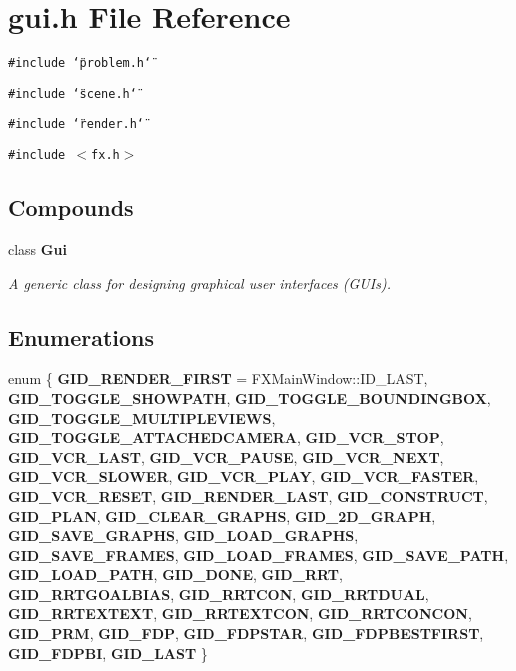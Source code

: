 \section{gui.h File Reference}
\label{gui_h}
{\tt \#include \char`\"{}problem.h\char`\"{}}\par
{\tt \#include \char`\"{}scene.h\char`\"{}}\par
{\tt \#include \char`\"{}render.h\char`\"{}}\par
{\tt \#include $<$fx.h$>$}\par
\subsection*{Compounds}
\begin{CompactItemize}
\item 
class {\bf Gui}
\begin{CompactList}\small\item\em A generic class for designing graphical user interfaces (GUIs).\item\end{CompactList}\end{CompactItemize}
\subsection*{Enumerations}
\begin{CompactItemize}
\item 
enum \{ {\bf GID\_\-RENDER\_\-FIRST} =  FXMain\-Window::ID\_\-LAST, 
{\bf GID\_\-TOGGLE\_\-SHOWPATH}, 
{\bf GID\_\-TOGGLE\_\-BOUNDINGBOX}, 
{\bf GID\_\-TOGGLE\_\-MULTIPLEVIEWS}, 
{\bf GID\_\-TOGGLE\_\-ATTACHEDCAMERA}, 
{\bf GID\_\-VCR\_\-STOP}, 
{\bf GID\_\-VCR\_\-LAST}, 
{\bf GID\_\-VCR\_\-PAUSE}, 
{\bf GID\_\-VCR\_\-NEXT}, 
{\bf GID\_\-VCR\_\-SLOWER}, 
{\bf GID\_\-VCR\_\-PLAY}, 
{\bf GID\_\-VCR\_\-FASTER}, 
{\bf GID\_\-VCR\_\-RESET}, 
{\bf GID\_\-RENDER\_\-LAST}, 
{\bf GID\_\-CONSTRUCT}, 
{\bf GID\_\-PLAN}, 
{\bf GID\_\-CLEAR\_\-GRAPHS}, 
{\bf GID\_\-2D\_\-GRAPH}, 
{\bf GID\_\-SAVE\_\-GRAPHS}, 
{\bf GID\_\-LOAD\_\-GRAPHS}, 
{\bf GID\_\-SAVE\_\-FRAMES}, 
{\bf GID\_\-LOAD\_\-FRAMES}, 
{\bf GID\_\-SAVE\_\-PATH}, 
{\bf GID\_\-LOAD\_\-PATH}, 
{\bf GID\_\-DONE}, 
{\bf GID\_\-RRT}, 
{\bf GID\_\-RRTGOALBIAS}, 
{\bf GID\_\-RRTCON}, 
{\bf GID\_\-RRTDUAL}, 
{\bf GID\_\-RRTEXTEXT}, 
{\bf GID\_\-RRTEXTCON}, 
{\bf GID\_\-RRTCONCON}, 
{\bf GID\_\-PRM}, 
{\bf GID\_\-FDP}, 
{\bf GID\_\-FDPSTAR}, 
{\bf GID\_\-FDPBESTFIRST}, 
{\bf GID\_\-FDPBI}, 
{\bf GID\_\-LAST}
 \}
\end{CompactItemize}


